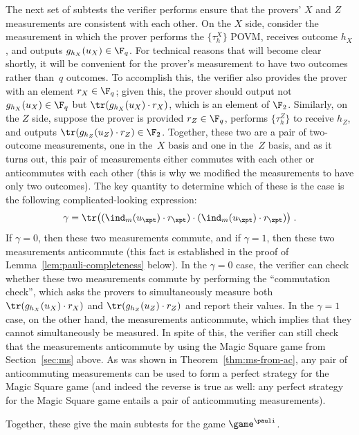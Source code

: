 The next set of subtests the verifier performs ensure that the provers' $X$ and $Z$ measurements are consistent with each other.
On the $X$ side, consider the measurement in which the prover performs the $\{\tau_h^X\}$ POVM,
receives outcome $h_X$, and outputs $g_{h_X}(u_X) \in \F_q$.
For technical reasons that will become clear shortly,
it will be convenient for the prover's measurement to have two outcomes rather than~$q$ outcomes.
To accomplish this, the verifier also provides the prover with an element $r_X \in \F_q$;
given this, the prover should output not $g_{h_X}(u_X) \in \F_q$ but $\tr(g_{h_X}(u_X) \cdot r_X)$, which is an element of $\F_2$.
Similarly, on the $Z$ side, suppose the prover is provided $r_Z \in \F_q$,
performs $\{\tau_h^Z\}$ to receive $h_Z$, and outputs $\tr(g_{h_Z}(u_Z) \cdot r_Z) \in \F_2$.
Together, these two are a pair of two-outcome measurements, one in the~$X$ basis and one in the~$Z$ basis,
and as it turns out, this pair of measurements either commutes with each other or anticommutes with each other
(this is why we modified the measurements to have only two outcomes).
The key quantity to determine which of these is the case is the following complicated-looking expression:
\begin{equation*}
\gamma = \tr \bigl( (\ind_{m}(u_\xpt) \cdot r_\xpt) \cdot
      (\ind_{m}(u_\zpt) \cdot r_\zpt) \bigr)\;.
\end{equation*}
If $\gamma = 0$, then these two measurements commute, and if $\gamma = 1$, then these two measurements anticommute
(this fact is established in the proof of Lemma~\ref{lem:pauli-completeness} below).
In the $\gamma = 0$ case, the verifier can check whether these two measurements commute by performing the ``commutation check'',
which asks the provers to simultaneously measure both $\tr(g_{h_X}(u_X) \cdot r_X)$ and $\tr(g_{h_Z}(u_Z) \cdot r_Z)$ and report their values.
In the $\gamma = 1$ case, on the other hand, the measurements anticommute, which implies that they cannot simultaneously be measured.
In spite of this, the verifier can still check that the measurements anticommute by using the Magic Square game from Section~\ref{sec:ms} above.
As was shown in Theorem~\ref{thm:ms-from-ac}, any pair of anticommuting measurements
can be used to form a perfect strategy for the Magic Square game
(and indeed the reverse is true as well: any perfect strategy for the Magic Square game entails a pair of anticommuting measurements).

Together, these give the main subtests for the game $\game^\pauli$.

